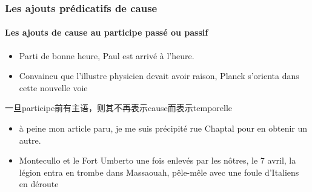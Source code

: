 \documentclass[UTF8]{report}
\begin{document}
\subsubsection{Les ajouts prédicatifs de cause}
\paragraph{Les ajouts de cause au participe passé ou passif}
\begin{itemize}
    \item Parti de bonne heure, Paul est arrivé à l’heure.
    \item Convaincu que l’illustre physicien devait avoir raison, Planck s’orienta dans cette nouvelle voie
\end{itemize}
一旦participe前有主语，则其不再表示cause而表示temporelle
\begin{itemize}
    \item à peine mon article paru, je me suis précipité rue Chaptal pour en obtenir un autre.
    \item Montecullo et le Fort Umberto une fois enlevés par les nôtres, le 7 avril, la légion entra en trombe dans Massaouah, pêle-mêle avec une foule d’Italiens en déroute
\end{itemize}
\end{document}
